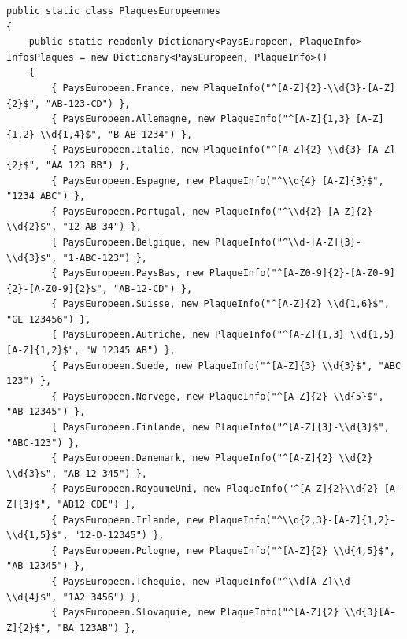\documentclass[main.tex]{subfiles}
\begin{document}
\begin{lstlisting}
public static class PlaquesEuropeennes
{
    public static readonly Dictionary<PaysEuropeen, PlaqueInfo> InfosPlaques = new Dictionary<PaysEuropeen, PlaqueInfo>()
    {
        { PaysEuropeen.France, new PlaqueInfo("^[A-Z]{2}-\\d{3}-[A-Z]{2}$", "AB-123-CD") },
        { PaysEuropeen.Allemagne, new PlaqueInfo("^[A-Z]{1,3} [A-Z]{1,2} \\d{1,4}$", "B AB 1234") },
        { PaysEuropeen.Italie, new PlaqueInfo("^[A-Z]{2} \\d{3} [A-Z]{2}$", "AA 123 BB") },
        { PaysEuropeen.Espagne, new PlaqueInfo("^\\d{4} [A-Z]{3}$", "1234 ABC") },
        { PaysEuropeen.Portugal, new PlaqueInfo("^\\d{2}-[A-Z]{2}-\\d{2}$", "12-AB-34") },
        { PaysEuropeen.Belgique, new PlaqueInfo("^\\d-[A-Z]{3}-\\d{3}$", "1-ABC-123") },
        { PaysEuropeen.PaysBas, new PlaqueInfo("^[A-Z0-9]{2}-[A-Z0-9]{2}-[A-Z0-9]{2}$", "AB-12-CD") },
        { PaysEuropeen.Suisse, new PlaqueInfo("^[A-Z]{2} \\d{1,6}$", "GE 123456") },
        { PaysEuropeen.Autriche, new PlaqueInfo("^[A-Z]{1,3} \\d{1,5} [A-Z]{1,2}$", "W 12345 AB") },
        { PaysEuropeen.Suede, new PlaqueInfo("^[A-Z]{3} \\d{3}$", "ABC 123") },
        { PaysEuropeen.Norvege, new PlaqueInfo("^[A-Z]{2} \\d{5}$", "AB 12345") },
        { PaysEuropeen.Finlande, new PlaqueInfo("^[A-Z]{3}-\\d{3}$", "ABC-123") },
        { PaysEuropeen.Danemark, new PlaqueInfo("^[A-Z]{2} \\d{2} \\d{3}$", "AB 12 345") },
        { PaysEuropeen.RoyaumeUni, new PlaqueInfo("^[A-Z]{2}\\d{2} [A-Z]{3}$", "AB12 CDE") },
        { PaysEuropeen.Irlande, new PlaqueInfo("^\\d{2,3}-[A-Z]{1,2}-\\d{1,5}$", "12-D-12345") },
        { PaysEuropeen.Pologne, new PlaqueInfo("^[A-Z]{2} \\d{4,5}$", "AB 12345") },
        { PaysEuropeen.Tchequie, new PlaqueInfo("^\\d[A-Z]\\d \\d{4}$", "1A2 3456") },
        { PaysEuropeen.Slovaquie, new PlaqueInfo("^[A-Z]{2} \\d{3}[A-Z]{2}$", "BA 123AB") },

\end{lstlisting}
\end{document}
